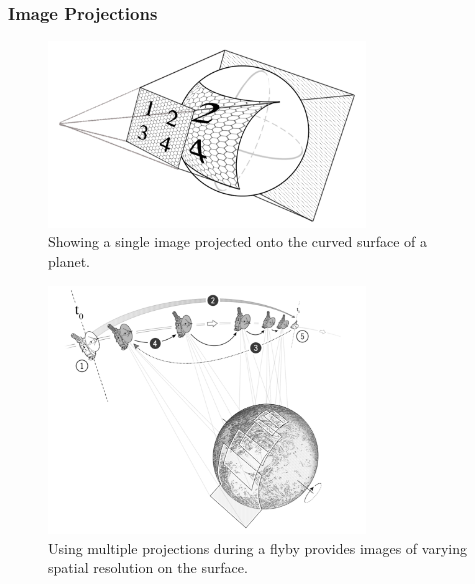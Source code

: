 \subsubsection{Image Projections} \label{contributions:astro:sc:projections}
\begin{figure}
\centering
\includegraphics[width=0.75\textwidth]{figures/contributions/sc/single_projection.png}
\caption{Showing a single image projected onto the curved surface of a planet.}
\label{contributions:astro:sc:singleprojection}
\end{figure}

\begin{figure}
\centering
\includegraphics[width=0.75\textwidth]{figures/contributions/sc/new_horizons_projection.png}
\caption{Using multiple projections during a flyby provides images of varying spatial resolution on the surface.}
\label{contributions:astro:sc:newhorizonsprojection}
\end{figure}


